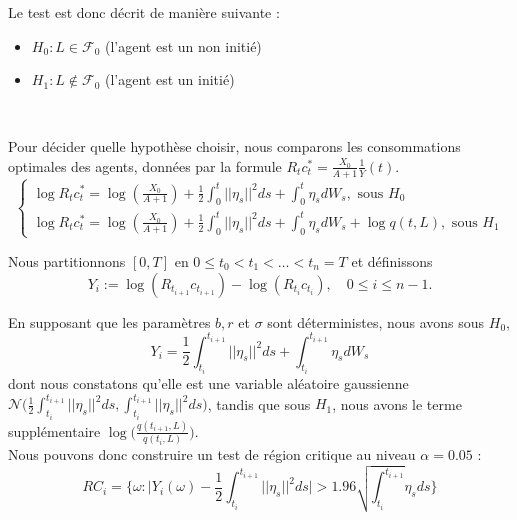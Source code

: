 \documentclass[../finalreport.tex]{subfiles}
\begin{document}
Le test est donc décrit de manière suivante : 
\begin{itemize}
\item $H_0 : L \in \mathcal{F}_0$ (l'agent est un non initié) \
\item $H_1 : L \notin \mathcal{F}_0$ (l'agent est un initié)
\end{itemize}
\

Pour décider quelle hypothèse choisir, nous comparons les consommations optimales des agents, données par la formule $\displaystyle R_t c^*_t = \frac{X_0}{A+1}\frac{1}{Y}(t)$.\\
\mathleft
\begin{equation*}
\begin{cases} \log R_t c^*_t = \log(\frac{X_0}{A+1}) + \frac{1}{2}  \int_{0}^{t} ||\eta_s||^2 ds + \int_{0}^{t} \eta_s dW_s , \text{ sous } H_0\\

\log R_t c^*_t = \log(\frac{X_0}{A+1}) + \frac{1}{2}  \int_{0}^{t} ||\eta_s||^2 ds + \int_{0}^{t} \eta_s dW_s + \log q(t, L), \text{ sous } H_1 \end{cases}
\end{equation*}

Nous partitionnons $[0, T]$ en $0 \leq t_0 < t_1 < \dots <t_n = T$ et définissons 
\mathcenter
\begin{equation*}
Y_i := \log(R_{t_{i+1}} c_{t_{i+1}}) - \log (R_{t_{i}}c_{t_{i}}), \quad 0 \leq i \leq n-1.
\end{equation*}

En supposant que les paramètres $b, r$ et $\sigma$ sont déterministes, nous avons sous $H_0$,
\begin{equation*}
\displaystyle Y_i =  \frac{1}{2} \int_{t_i}^{t_{i+1}} ||\eta_s||^2 ds + \int_{t_i}^{t_{i+1}} \eta_s dW_s 
\end{equation*}
dont nous constatons qu'elle est une variable aléatoire gaussienne $\mathcal{N}\big(\frac{1}{2} \int_{t_i}^{t_{i+1}} ||\eta_s||^2 ds , \int_{t_i}^{t_{i+1}} ||\eta_s||^2 ds \big)$, tandis que sous $H_1$, nous avons le terme supplémentaire $\displaystyle \log\big(\frac{q(t_{i+1}, L)}{q(t_i, L)}\big)$.\\

Nous pouvons donc construire un test de région critique au niveau $\alpha = 0.05$ :
\begin{equation*}
RC_i = \Big\{ \omega : \big|Y_i (\omega) - \frac{1}{2} \int_{t_i}^{t_{i+1}} ||\eta_s||^2 ds \big| > 1.96 \sqrt{\int_{t_i}^{t_{i+1}} }\eta_s ds \Big\}
\end{equation*}
\end{document}
